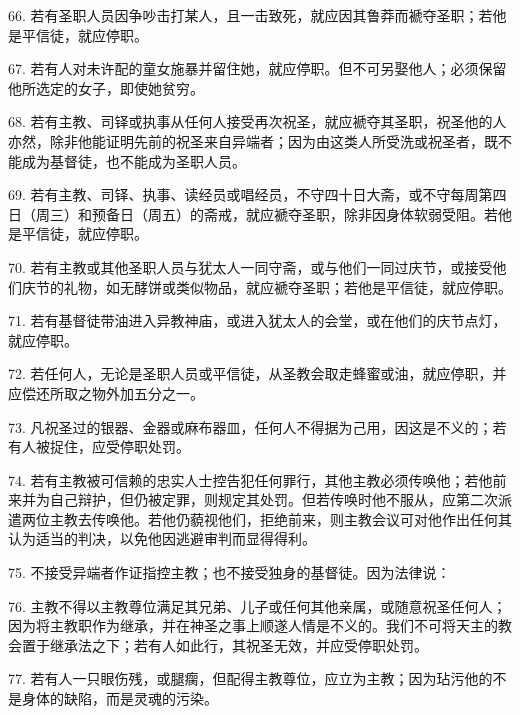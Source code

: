 66. 若有圣职人员因争吵击打某人，且一击致死，就应因其鲁莽而褫夺圣职；若他是平信徒，就应停职。\par

67. 若有人对未许配的童女施暴并留住她，就应停职。但不可另娶他人；必须保留他所选定的女子，即使她贫穷。\par

68. 若有主教、司铎或执事从任何人接受再次祝圣，就应褫夺其圣职，祝圣他的人亦然，除非他能证明先前的祝圣来自异端者；因为由这类人所受洗或祝圣者，既不能成为基督徒，也不能成为圣职人员。\par

69. 若有主教、司铎、执事、读经员或唱经员，不守四十日大斋，或不守每周第四日（周三）和预备日（周五）的斋戒，就应褫夺圣职，除非因身体软弱受阻。若他是平信徒，就应停职。\par

70. 若有主教或其他圣职人员与犹太人一同守斋，或与他们一同过庆节，或接受他们庆节的礼物，如无酵饼或类似物品，就应褫夺圣职；若他是平信徒，就应停职。\par

71. 若有基督徒带油进入异教神庙，或进入犹太人的会堂，或在他们的庆节点灯，就应停职。\par

72. 若任何人，无论是圣职人员或平信徒，从圣教会取走蜂蜜或油，就应停职，并应偿还所取之物外加五分之一。\par

73. 凡祝圣过的银器、金器或麻布器皿，任何人不得据为己用，因这是不义的；若有人被捉住，应受停职处罚。\par

74. 若有主教被可信赖的忠实人士控告犯任何罪行，其他主教必须传唤他；若他前来并为自己辩护，但仍被定罪，则规定其处罚。但若传唤时他不服从，应第二次派遣两位主教去传唤他。若他仍藐视他们，拒绝前来，则主教会议可对他作出任何其认为适当的判决，以免他因逃避审判而显得得利。\par

75. 不接受异端者作证指控主教；也不接受独身的基督徒。因为法律说：\par

76. 主教不得以主教尊位满足其兄弟、儿子或任何其他亲属，或随意祝圣任何人；因为将主教职作为继承，并在神圣之事上顺遂人情是不义的。我们不可将天主的教会置于继承法之下；若有人如此行，其祝圣无效，并应受停职处罚。\par

77. 若有人一只眼伤残，或腿瘸，但配得主教尊位，应立为主教；因为玷污他的不是身体的缺陷，而是灵魂的污染。\par

